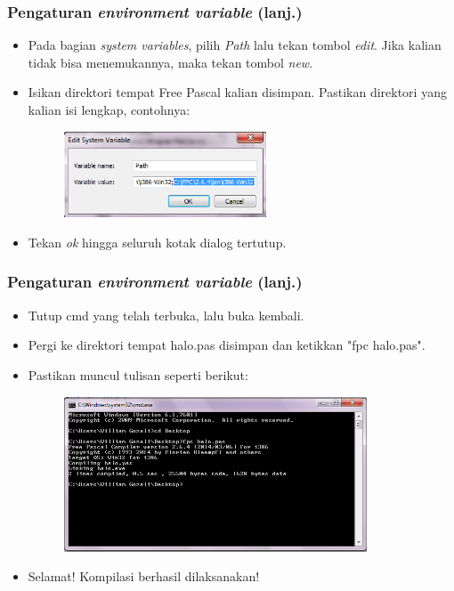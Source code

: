 \documentclass{beamer}
\begin{document}
\begin{frame}
\frametitle{Pengaturan \textit{environment variable} (lanj.)}
\begin{itemize}
	\item Pada bagian \textit{system variables}, pilih \textit{Path} lalu tekan tombol \textit{edit}. Jika kalian tidak bisa menemukannya, maka tekan tombol \textit{new}.
	\item Isikan direktori tempat Free Pascal kalian disimpan. Pastikan direktori yang kalian isi lengkap, contohnya:
	\begin{figure}
		\includegraphics[width=6cm]{asset/path_4.PNG}
	\end{figure}
	\item Tekan \textit{ok} hingga seluruh kotak dialog tertutup.
\end{itemize}
\end{frame}

\begin{frame}
\frametitle{Pengaturan \textit{environment variable} (lanj.)}
\begin{itemize}
	\item Tutup cmd yang telah terbuka, lalu buka kembali.
	\item Pergi ke direktori tempat halo.pas disimpan dan ketikkan "fpc halo.pas".
	\item Pastikan muncul tulisan seperti berikut:
	\begin{figure}
		\includegraphics[width=9cm]{asset/hello_3.PNG}
	\end{figure}
	\item Selamat! Kompilasi berhasil dilaksanakan!
\end{itemize}
\end{frame}
\end{document}
